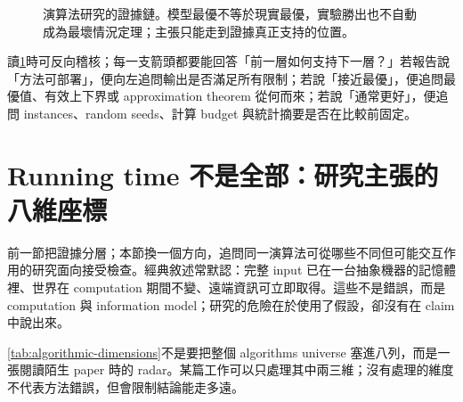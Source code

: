 \documentclass[11pt,a4paper,oneside,openany]{book}
\begin{document}
\begin{figure}[htbp]
\centering
{}
\caption{演算法研究的證據鏈。模型最優不等於現實最優，實驗勝出也不自動成為最壞情況定理；主張只能走到證據真正支持的位置。}
\label{fig:evidence-chain}
\end{figure}

讀\cref{fig:evidence-chain}時可反向稽核；每一支箭頭都要能回答「前一層如何支持下一層？」若報告說「方法可部署」，便向左追問輸出是否滿足所有限制；若說「接近最優」，便追問最優值、有效上下界或 approximation theorem 從何而來；若說「通常更好」，便追問 instances、random seeds、計算 budget 與統計摘要是否在比較前固定。

\section{Running time 不是全部：研究主張的八維座標}
\label{sec:algorithmic-dimensions}

前一節把證據分層；本節換一個方向，追問同一演算法可從哪些不同但可能交互作用的研究面向接受檢查。經典敘述常默認：完整 input 已在一台抽象機器的記憶體裡、世界在 computation 期間不變、遠端資訊可立即取得。這些不是錯誤，而是 computation 與 information model；研究的危險在於使用了假設，卻沒有在 claim 中說出來。

\cref{tab:algorithmic-dimensions}不是要把整個 algorithms universe 塞進八列，而是一張閱讀陌生 paper 時的 radar。某篇工作可以只處理其中兩三維；沒有處理的維度不代表方法錯誤，但會限制結論能走多遠。
\end{document}
